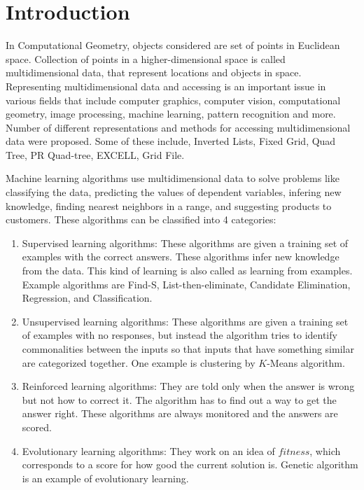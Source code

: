 \documentclass[runningheads]{llncs}
\begin{document}
\section{Introduction}
\label{sec:1}
In Computational Geometry, objects considered are set of points in Euclidean space. Collection of points in a higher-dimensional space is called multidimensional data, that represent locations and objects in space. Representing multidimensional data and accessing is an important issue in various fields that include computer graphics, computer vision, computational geometry, image processing, machine learning, pattern recognition and more. Number of different representations and methods for accessing multidimensional data were proposed\cite{H.Samet}. Some of these include, Inverted Lists\cite{D.E.Knuth}, Fixed Grid\cite{J.L.Bentley}, Quad Tree\cite{R.A.Finkel}, PR Quad-tree\cite{J.A.Orenstein}, EXCELL\cite{M.Tamminen}, Grid File\cite{J.Nievergelt}.

Machine learning algorithms use multidimensional data to solve problems like classifying the data, predicting the values of dependent variables, infering new knowledge, finding nearest neighbors in a range, and suggesting products to customers. These algorithms can be classified into 4 categories:
\begin{enumerate}
	\item{Supervised learning algorithms: These algorithms are given a training set of examples with the correct answers. These algorithms infer new knowledge from the data. This kind of learning is also called as learning from examples. Example algorithms are Find-S, List-then-eliminate, Candidate Elimination, Regression, and Classification.}
	\item{Unsupervised learning algorithms: These algorithms are given a training set of examples with no responses, but instead the algorithm tries to identify commonalities between the inputs so that inputs that have something similar are categorized together. One example is clustering by $K$-Means algorithm.}
	\item{Reinforced learning algorithms: They are told only when the answer is wrong but not how to correct it. The algorithm has to find out a way to get the answer right. These algorithms are always monitored and the answers are scored.}
	\item{Evolutionary learning algorithms: They work on an idea of $fitness$, which corresponds to a score for how good the current solution is. Genetic algorithm is an example of evolutionary learning.}
\end{enumerate}
\end{document}
